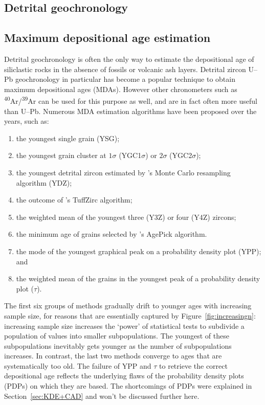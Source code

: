 \begin{refsection}

\chapter{Detrital geochronology}\label{ch:detrital}

\section{Maximum depositional age estimation}

Detrital geochronology is often the only way to estimate the
depositional age of siliclastic rocks in the absence of fossils or
volcanic ash layers. Detrital zircon U--Pb geochronology in particular
has become a popular technique to obtain maximum depositional ages
(MDAs). However other chronometers such as
\textsuperscript{40}Ar/\textsuperscript{39}Ar can be used for this
purpose as well, and are in fact often more useful than
U--Pb. Numerous MDA estimation algorithms have been proposed over the
years, such as:

\begin{enumerate}
\item the youngest single grain (YSG);
\item the youngest grain cluster at $1\sigma$ (YGC1$\sigma$) or
  $2\sigma$ (YGC2$\sigma$);
\item the youngest detrital zircon estimated by \citet{ludwig2003}'s
  Monte Carlo resampling algorithm (YDZ);
\item the outcome of \citet{ludwig2002}'s TuffZirc algorithm;
\item the weighted mean of the youngest three (Y3Z) or four (Y4Z)
  zircons;
\item the minimum age of grains selected by \citet{gehrels2003}'s
  AgePick algorithm.
\item the mode of the youngest graphical peak on a probability density
  plot (YPP); and
\item the weighted mean of the grains in the youngest peak of a
  probability density plot ($\tau$).
\end{enumerate}

The first six groups of methods gradually drift to younger ages with
increasing sample size, for reasons that are essentially captured by
Figure~\ref{fig:increasingn}: increasing sample size increases the
`power' of statistical tests to subdivide a population of values into
smaller subpopulations. The youngest of these subpopulations
inevitably gets younger as the number of subpopulations increases.  In
contrast, the last two methods converge to ages that are
systematically too old. The failure of YPP and $\tau$ to retrieve the
correct depositional age reflects the underlying flaws of the
probability density plots (PDPs) on which they are based. The
shortcomings of PDPs were explained in Section~\ref{sec:KDE+CAD} and
won't be discussed further here.\\


\end{refsection}
